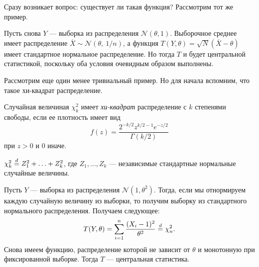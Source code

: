 Сразу возникает вопрос: существует ли такая функция? Рассмотрим тот же пример.

\begin{example}
    Пусть снова $Y$ --- выборка из распределения $\mathcal{N}(\theta, 1)$.
    Выборочное среднее имеет распределение $\overline{X} \sim \mathcal{N}(\theta,\ 1/n)$, а функция $T(Y, \theta) = \sqrt{N}(\overline{X} - \theta)$ имеет стандартное нормальное распределение.
    Но тогда $T$ и будет центральной статистикой, поскольку оба условия очевидным образом выполнены.
\end{example}

Рассмотрим еще один менее тривиальный пример.
Но для начала вспомним, что такое хи-квадрат распределение.

\begin{definition}
    Случайная величиная $\chi_k^2$ имеет \emph{хи-квадрат} распределение с $k$ степенями свободы, если ее плотность имеет вид
    \[
        f(z) = \frac{2^{-k/2} z^{k/2 - 1} e^{-z/2}}{\Gamma(k/2)}
    \]
при $z > 0$ и 0 иначе.
\end{definition}

\begin{remark}
    $\chi_k^2 \overset{d}{=} Z_1^2 + \ldots + Z_k^2$, где $Z_1, \ldots, Z_k$ --- независимые стандартные нормальные случайные величины.
\end{remark}

\begin{example}
    Пусть $Y$ --- выборка из распределения $\mathcal{N}(1, \theta^2)$.
    Тогда, если мы отнормируем каждую случайную величину из выборки, то получим выборку из стандартного нормального распределения.
    Получаем следующее:
    \[
        T(Y, \theta) = \sum_{i=1}^n \frac{(X_i - 1)^2}{\theta^2} \overset{d}{=} \chi_n^2.
    \]
    Снова имеем функцию, распределение которой не зависит от $\theta$ и монотонную при фиксированной выборке.
    Тогда $T$ --- центральная статистика.
\end{example}

